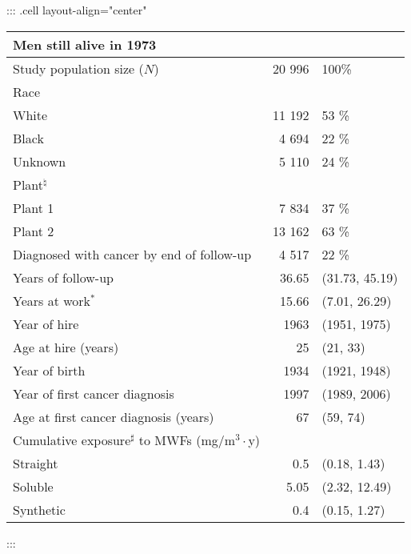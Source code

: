 \documentclass[
  11pt,
  letterpaper,
  DIV=11,
  numbers=noendperiod]{scrartcl}
\theoremstyle{remark}\newtheorem*{claim}{Claim}
\begin{document}
\begin{table}[H]
\centering
::: {.cell layout-align="center"}
\begin{tabular}{lrl}
  \toprule
\multicolumn{3}{l}{Men still alive in 1973}\\%
  \midrule
Study population size ($N$) & 20 996 & 100\% \\ 
  Race &  &  \\ 
  \hspace{10pt}White & 11 192 & 53 \% \\ 
  \hspace{10pt}Black & 4 694 & 22 \% \\ 
  \hspace{10pt}Unknown & 5 110 & 24 \% \\ 
  Plant$^\natural$ &  &  \\ 
  \hspace{10pt}Plant 1 & 7 834 & 37 \% \\ 
  \hspace{10pt}Plant 2 & 13 162 & 63 \% \\ 
  Diagnosed with cancer by end of follow-up & 4 517 & 22 \% \\ 
  \hline Years of follow-up & 36.65 & (31.73, 45.19) \\ 
  Years at work$^*$ & 15.66 & (7.01, 26.29) \\ 
  Year of hire & 1963 & (1951, 1975) \\ 
  Age at hire (years) & 25 & (21, 33) \\ 
  Year of birth & 1934 & (1921, 1948) \\ 
  Year of first cancer diagnosis & 1997 & (1989, 2006) \\ 
  Age at first cancer diagnosis (years) & 67 & (59, 74) \\ 
  Cumulative exposure$^\sharp$ to MWFs (mg/m$^3\cdot$y) &  &  \\ 
  \hspace{10pt}Straight & 0.5 & (0.18, 1.43) \\ 
  \hspace{10pt}Soluble & 5.05 & (2.32, 12.49) \\ 
  \hspace{10pt}Synthetic & 0.4 & (0.15, 1.27) \\ 
   \bottomrule
\end{tabular}
:::
\end{table}

\hypertarget{section-1}{%
\section{}\label{section-1}}
\end{document}

